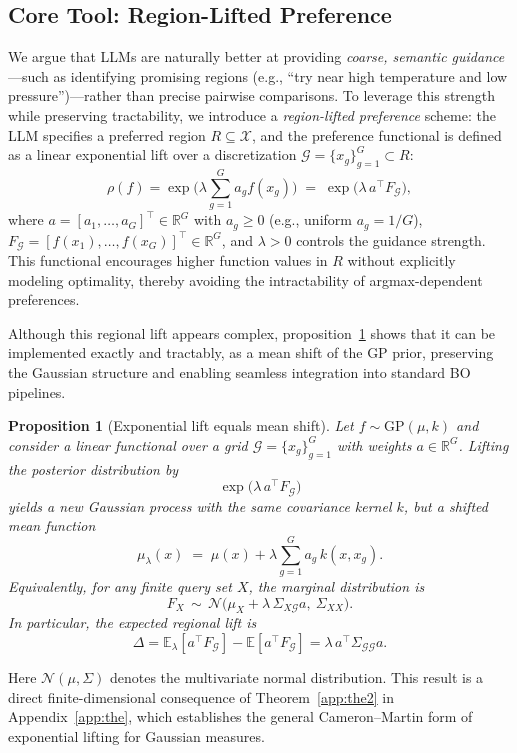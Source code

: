 \documentclass{article} %
\newtheorem{proposition}{Proposition}
\begin{document}
\subsection{Core Tool: Region-Lifted Preference}
\label{sec:region-preference}
We argue that LLMs are naturally better at providing \emph{coarse, semantic guidance}—such as identifying promising regions (e.g., “try near high temperature and low pressure”)—rather than precise pairwise comparisons. To leverage this strength while preserving tractability, we introduce a \emph{region-lifted preference} scheme: the LLM specifies a preferred region $R \subseteq \mathcal X$, and the preference functional is defined as a linear exponential lift over a discretization $\mathcal G = \{x_g\}_{g=1}^G \subset R$:
\[
\rho(f) = \exp\!\Big( \lambda \sum_{g=1}^G a_g f(x_g) \Big) \;=\; \exp\!\big( \lambda \, a^\top F_{\mathcal G} \big),
\]
where $a = [a_1, \dots, a_G]^\top \in \mathbb{R}^G$ with $a_g \ge 0$ 
(e.g., uniform $a_g = 1/G$), $F_{\mathcal G} = [f(x_1), \dots, f(x_G)]^\top \in \mathbb{R}^G$, and $\lambda > 0$ controls the guidance strength. This functional encourages higher function values in $R$ without explicitly modeling optimality, thereby avoiding the intractability of argmax-dependent preferences.


Although this regional lift appears complex, proposition~\ref{prop:tilt} shows that it can be implemented exactly  and tractably, as a mean shift of the GP prior, preserving the Gaussian structure and enabling seamless integration into standard BO pipelines.

\begin{proposition}[Exponential lift equals mean shift]
\label{prop:tilt}
Let $f \sim \mathrm{GP}(\mu,k)$ and consider a linear functional over a grid $\mathcal G=\{x_g\}_{g=1}^G$ with weights $a\in\mathbb R^G$.  
Lifting the posterior distribution by
\[
\exp\!\big(\lambda\,a^\top F_{\mathcal G}\big)
\]
yields a new Gaussian process with the same covariance kernel $k$, but a shifted mean function 
\[
\mu_\lambda(x) \;=\; \mu(x) + \lambda \sum_{g=1}^G a_g\, k(x,x_g).
\]
Equivalently, for any finite query set $X$, the marginal distribution is
\[
F_X \,\sim\, \mathcal N\!\big(\mu_X + \lambda\,\Sigma_{X\mathcal G}a,\ \Sigma_{XX}\big).
\]
In particular, the expected regional lift is
\[
\Delta = \mathbb E_\lambda[a^\top F_{\mathcal G}] - \mathbb E[a^\top F_{\mathcal G}]
= \lambda\,a^\top \Sigma_{\mathcal G\mathcal G} a.
\]
\end{proposition}
Here $\mathcal N(\mu, \Sigma)$ denotes the multivariate normal distribution. This result is a direct finite-dimensional consequence of Theorem~\ref{app:the2} in Appendix~\ref{app:the}, which establishes the general Cameron--Martin form of exponential lifting for Gaussian measures.
\end{document}

